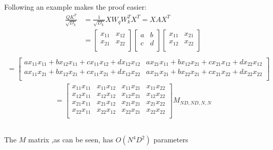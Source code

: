 \documentclass{article}
\begin{document}
\subsection{}
Following an example makes the proof easier:
\begin{align*}
    \frac{Q K^T}{\sqrt{D_k}} &= \frac{1}{\sqrt{D_k}} XW_qW_k^TX^T=XAX^T \\
    &= 
    \begin{bmatrix}
        x_{11} & x_{12} \\
        x_{21} & x_{22} \\
    \end{bmatrix}
    \begin{bmatrix}
        a & b \\
        c & d \\
    \end{bmatrix}
    \begin{bmatrix}
        x_{11} & x_{21} \\
        x_{12} & x_{22} \\
    \end{bmatrix} \\
\end{align*}
\begin{align*}    
    = 
    \begin{bmatrix}
        ax_{11}x_{11} + bx_{12}x_{11} + cx_{11}x_{12} + dx_{12}x_{12} &
        ax_{21}x_{11} + bx_{12}x_{21} + cx_{21}x_{12} + dx_{22}x_{12} \\
        ax_{11}x_{21} + bx_{12}x_{21} + cx_{11}x_{21} + dx_{12}x_{22} &
        ax_{21}x_{21} + bx_{22}x_{21} + cx_{21}x_{22} + dx_{22}x_{22} \\
    \end{bmatrix}
\end{align*}
\begin{align*}
    =
    \begin{bmatrix}
        x_{11}x_{11} & x_{11}x_{12} & x_{11}x_{21} & x_{11}x_{22} \\
        x_{12}x_{11} & x_{12}x_{12} & x_{12}x_{21} & x_{12}x_{22} \\
        x_{21}x_{11} & x_{21}x_{12} & x_{21}x_{21} & x_{21}x_{22} \\
        x_{22}x_{11} & x_{22}x_{12} & x_{22}x_{21} & x_{22}x_{22} \\
    \end{bmatrix}
    M_{ND,ND,N,N}
\end{align*}


\subsection{}
The $M$ matrix ,as can be seen, has $O(N^4D^2)$ parameters
\end{document}
